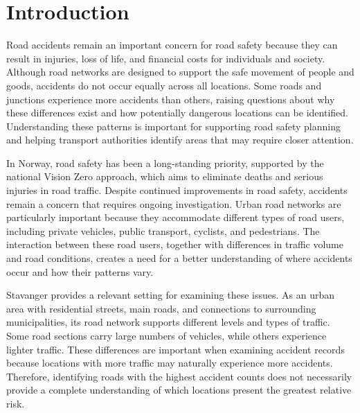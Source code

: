 

\section{Introduction}\label{sec:introduction}
Road accidents remain an important concern for road safety because they can result in injuries, loss of life, and financial costs for individuals and society. Although road networks are designed to support the safe movement of people and goods, accidents do not occur equally across all locations. Some roads and junctions experience more accidents than others, raising questions about why these differences exist and how potentially dangerous locations can be identified. Understanding these patterns is important for supporting road safety planning and helping transport authorities identify areas that may require closer attention.

In Norway, road safety has been a long-standing priority, supported by the national Vision Zero approach, which aims to eliminate deaths and serious injuries in road traffic. Despite continued improvements in road safety, accidents remain a concern that requires ongoing investigation. Urban road networks are particularly important because they accommodate different types of road users, including private vehicles, public transport, cyclists, and pedestrians. The interaction between these road users, together with differences in traffic volume and road conditions, creates a need for a better understanding of where accidents occur and how their patterns vary.

Stavanger provides a relevant setting for examining these issues. As an urban area with residential streets, main roads, and connections to surrounding municipalities, its road network supports different levels and types of traffic. Some road sections carry large numbers of vehicles, while others experience lighter traffic. These differences are important when examining accident records because locations with more traffic may naturally experience more accidents. Therefore, identifying roads with the highest accident counts does not necessarily provide a complete understanding of which locations present the greatest relative risk.

